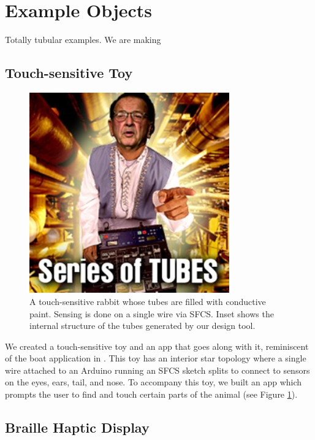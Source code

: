 \section{Example Objects}

Totally tubular examples.  We are making

\subsection{Touch-sensitive Toy}

\begin{figure}[h]
\centering
    \includegraphics[width=3.4in]{figures/series-of-tubes.jpg}
\caption{A touch-sensitive rabbit whose tubes are filled with conductive paint.  Sensing is done on a single wire via SFCS.  Inset shows the internal structure of the tubes generated by our design tool.}
\label{fig:toy}
\end{figure}

We created a touch-sensitive toy and an app that goes along with it, reminiscent of the boat application in \cite{Harrison-acoustic}.  This toy has an interior star topology where a single wire attached to an Arduino running an SFCS sketch splits to connect to sensors on the eyes, ears, tail, and nose.  To accompany this toy, we built an app which prompts the user to find and touch certain parts of the animal (see Figure \ref{fig:toy}).

\subsection{Braille Haptic Display}

